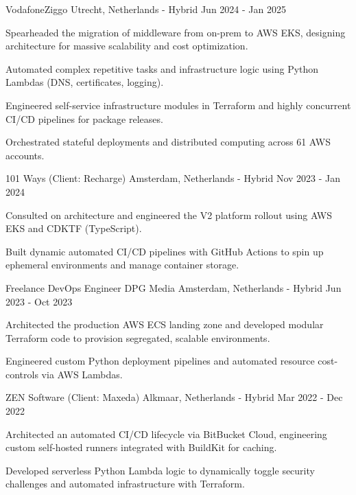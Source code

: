 
\begin{cventries}

{VodafoneZiggo}
{Utrecht, Netherlands - Hybrid}
{Jun 2024 - Jan 2025}
{
	\begin{cvitems}
		\item {Spearheaded the migration of middleware from on-prem to AWS EKS, designing architecture for massive scalability and cost optimization.}
		\item {Automated complex repetitive tasks and infrastructure logic using Python Lambdas (DNS, certificates, logging).}
		\item {Engineered self-service infrastructure modules in Terraform and highly concurrent CI/CD pipelines for package releases.}
		\item {Orchestrated stateful deployments and distributed computing across 61 AWS accounts.}
	\end{cvitems}
}

{101 Ways (Client: Recharge)}
{Amsterdam, Netherlands - Hybrid}
{Nov 2023 - Jan 2024}
{
	\begin{cvitems}
		\item {Consulted on architecture and engineered the V2 platform rollout using AWS EKS and CDKTF (TypeScript).}
		\item {Built dynamic automated CI/CD pipelines with GitHub Actions to spin up ephemeral environments and manage container storage.}
	\end{cvitems}
}

\cventry
{Freelance DevOps Engineer}
{DPG Media}
{Amsterdam, Netherlands - Hybrid}
{Jun 2023 - Oct 2023}
{
	\begin{cvitems}
		\item {Architected the production AWS ECS landing zone and developed modular Terraform code to provision segregated, scalable environments.}
		\item {Engineered custom Python deployment pipelines and automated resource cost-controls via AWS Lambdas.}
	\end{cvitems}
}

{ZEN Software (Client: Maxeda)}
{Alkmaar, Netherlands - Hybrid}
{Mar 2022 - Dec 2022}
{
	\begin{cvitems}
		\item {Architected an automated CI/CD lifecycle via BitBucket Cloud, engineering custom self-hosted runners integrated with BuildKit for caching.}
		\item {Developed serverless Python Lambda logic to dynamically toggle security challenges and automated infrastructure with Terraform.}
	\end{cvitems}
}


\end{cventries}
